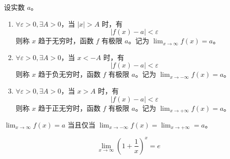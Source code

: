 \begin{definition}
    设实数 $a$。
    \begin{enumerate}
        \item $\forall \varepsilon > 0, \exists A > 0$，当 $|x| > A$ 时，有
              \[|f(x) - a| < \varepsilon\]
              则称 $x$ 趋于无穷时，函数 $f$ 有极限 $a$。记为 $\displaystyle \lim_{x \to \infty}f(x) = a$。
        \item $\forall \varepsilon > 0, \exists A > 0$，当 $x < -A$ 时，有
              \[|f(x) - a| < \varepsilon\]
              则称 $x$ 趋于负无穷时，函数 $f$ 有极限 $a$。记为 $\displaystyle \lim_{x \to -\infty}f(x) = a$。
        \item $\forall \varepsilon > 0, \exists A > 0$，当 $x > A$ 时，有
              \[|f(x) - a| < \varepsilon\]
              则称 $x$ 趋于正无穷时，函数 $f$ 有极限 $a$。记为 $\displaystyle \lim_{x \to +\infty}f(x) = a$。
    \end{enumerate}
\end{definition}

\begin{theorem}
    $\displaystyle \lim_{x \to \infty}f(x) = a$ 当且仅当 $\displaystyle \lim_{x \to -\infty}f(x) = \lim_{x \to +\infty} = a$。
\end{theorem}

\hfill

\begin{example}
    \[\lim_{x \to \infty}\left(1 + \frac{1}{x}\right)^{x} = e\]
\end{example}

\hfill

